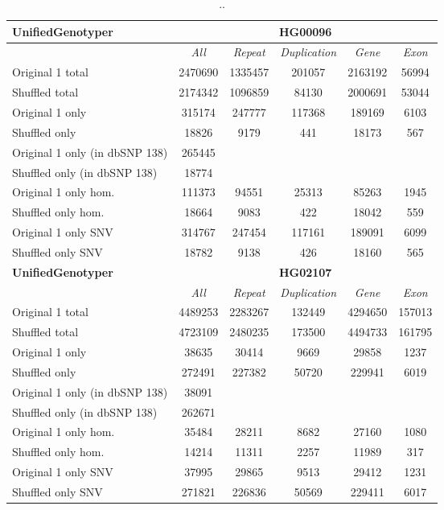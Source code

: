 \begin{table}[htb]
\begin{center}
\begin{tabular}{|l|c||c|c|c|c|}
\hline
{\bf UnifiedGenotyper} & \multicolumn{5}{|c|}{\bf HG00096} \\
\hline
\cline{2-6}
{\bf} & {\it All} & {\it Repeat} & {\it Duplication} & {\it Gene} & {\it Exon} \\
\hline
Original 1 total & 2470690 & 1335457 & 201057 & 2163192 & 56994\\ 
\hline
Shuffled total & 2174342 & 1096859 & 84130 & 2000691 & 53044\\ 
\hline
Original 1 only & 315174 & 247777 & 117368 & 189169 & 6103\\ 
\hline
Shuffled only & 18826 & 9179 & 441 & 18173 & 567\\ 
\hline
Original 1 only (in dbSNP 138) & 265445 &  &  &  & \\ 
\hline
Shuffled only (in dbSNP 138) & 18774 &  &  &  & \\ 
\hline
Original 1 only hom. & 111373 & 94551 & 25313 & 85263 & 1945\\ 
\hline
Shuffled only hom. & 18664 & 9083 & 422 & 18042 & 559\\ 
\hline
Original 1 only SNV & 314767 & 247454 & 117161 & 189091 & 6099\\ 
\hline
Shuffled only SNV & 18782 & 9138 & 426 & 18160 & 565\\ 
\hline
\hline
{\bf UnifiedGenotyper} & \multicolumn{5}{|c|}{\bf HG02107} \\
\hline
\cline{2-6}
{\bf} & {\it All} & {\it Repeat} & {\it Duplication} & {\it Gene} & {\it Exon} \\
\hline
Original 1 total & 4489253 & 2283267 & 132449 & 4294650 & 157013\\ 
\hline
Shuffled total & 4723109 & 2480235 & 173500 & 4494733 & 161795\\ 
\hline
Original 1 only & 38635 & 30414 & 9669 & 29858 & 1237\\ 
\hline
Shuffled only & 272491 & 227382 & 50720 & 229941 & 6019\\ 
\hline
Original 1 only (in dbSNP 138) & 38091 &  &  &  & \\ 
\hline
Shuffled only (in dbSNP 138) & 262671 &  &  &  & \\ 
\hline
Original 1 only hom. & 35484 & 28211 & 8682 & 27160 & 1080\\ 
\hline
Shuffled only hom. & 14214 & 11311 & 2257 & 11989 & 317\\ 
\hline
Original 1 only SNV & 37995 & 29865 & 9513 & 29412 & 1231\\ 
\hline
Shuffled only SNV & 271821 & 226836 & 50569 & 229411 & 6017\\ 
\hline
\end{tabular}
\end{center}
\caption{ .. }
\label{tab:orig-vs-shuf-ug}
\end{table}

